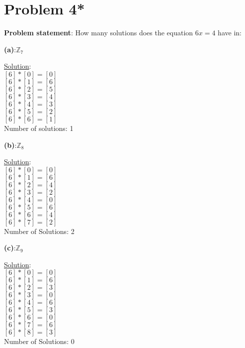 \documentclass{article} %
\begin{document}
\newpage

\section*{Problem 4*}


\textbf{Problem statement}: How many solutions does the equation $6x = 4$ have in:
\\

\begin{addmargin}[1em]{0em}
\textbf{(a)}:$\mathbb{Z}_{7}$
\begin{addmargin}[1em]{0em}
\underline{Solution}: \\
$[6] * [0] = [0]$ \\
$[6] * [1] = [6]$ \\
$[6] * [2] = [5]$ \\
$[6] * [3] = [4]$ \\
$[6] * [4] = [3]$ \\
$[6] * [5] = [2]$ \\
$[6] * [6] = [1]$ \\
Number of solutions: 1
\begin{addmargin}[1em]{0em}
\end{addmargin}
\end{addmargin}

\textbf{(b)}:$\mathbb{Z}_{8}$
\begin{addmargin}[1em]{0em}
\underline{Solution}: \\
$[6] * [0] = [0]$ \\
$[6] * [1] = [6]$ \\
$[6] * [2] = [4]$ \\
$[6] * [3] = [2]$ \\
$[6] * [4] = [0]$ \\
$[6] * [5] = [6]$ \\
$[6] * [6] = [4]$ \\
$[6] * [7] = [2]$ \\
Number of Solutions: 2
\begin{addmargin}[1em]{0em}
\end{addmargin}
\end{addmargin}

\textbf{(c)}:$\mathbb{Z}_{9}$
\begin{addmargin}[1em]{0em}
\underline{Solution}: \\
$[6] * [0] = [0]$ \\
$[6] * [1] = [6]$ \\
$[6] * [2] = [3]$ \\
$[6] * [3] = [0]$ \\
$[6] * [4] = [6]$ \\
$[6] * [5] = [3]$ \\
$[6] * [6] = [0]$ \\
$[6] * [7] = [6]$ \\
$[6] * [8] = [3]$ \\
Number of Solutions: 0
\begin{addmargin}[1em]{0em}
\end{addmargin}
\end{addmargin}


\end{addmargin}
\end{document}
